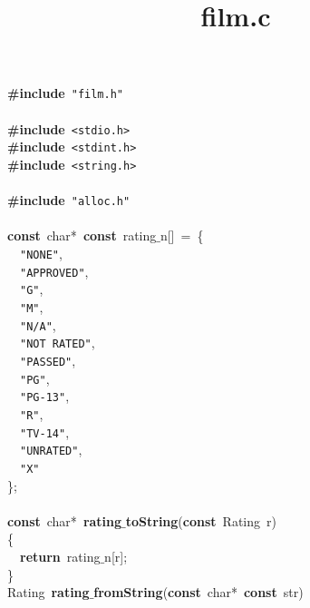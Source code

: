 \documentclass{article}
\title{film.c}
\date{}
\begin{document}
\maketitle

\noindent
\mbox{}\textbf{\#include}\ \texttt{"{}film.h"{}} \\
\mbox{} \\
\mbox{}\textbf{\#include}\ \texttt{\textless{}stdio.h\textgreater{}} \\
\mbox{}\textbf{\#include}\ \texttt{\textless{}stdint.h\textgreater{}} \\
\mbox{}\textbf{\#include}\ \texttt{\textless{}string.h\textgreater{}} \\
\mbox{} \\
\mbox{}\textbf{\#include}\ \texttt{"{}alloc.h"{}} \\
\mbox{} \\
\mbox{}\textbf{const}\ char*\ \textbf{const}\ rating$\_$n[]\ =\ \{ \\
\mbox{}\ \ \texttt{"{}NONE"{}}, \\
\mbox{}\ \ \texttt{"{}APPROVED"{}}, \\
\mbox{}\ \ \texttt{"{}G"{}}, \\
\mbox{}\ \ \texttt{"{}M"{}}, \\
\mbox{}\ \ \texttt{"{}N/A"{}}, \\
\mbox{}\ \ \texttt{"{}NOT\ RATED"{}}, \\
\mbox{}\ \ \texttt{"{}PASSED"{}}, \\
\mbox{}\ \ \texttt{"{}PG"{}}, \\
\mbox{}\ \ \texttt{"{}PG-13"{}}, \\
\mbox{}\ \ \texttt{"{}R"{}}, \\
\mbox{}\ \ \texttt{"{}TV-14"{}}, \\
\mbox{}\ \ \texttt{"{}UNRATED"{}}, \\
\mbox{}\ \ \texttt{"{}X"{}} \\
\mbox{}\}; \\
\mbox{} \\
\mbox{}\textbf{const}\ char*\ \textbf{rating$\_$toString}(\textbf{const}\ Rating\ r) \\
\mbox{}\{ \\
\mbox{}\ \ \textbf{return}\ rating$\_$n[r]; \\
\mbox{}\} \\
\mbox{}Rating\ \textbf{rating$\_$fromString}(\textbf{const}\ char*\ \textbf{const}\ str) \\
\end{document}
